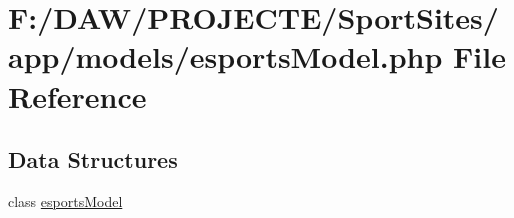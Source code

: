 \hypertarget{esports_model_8php}{}\section{F\+:/\+D\+A\+W/\+P\+R\+O\+J\+E\+C\+T\+E/\+Sport\+Sites/app/models/esports\+Model.php File Reference}
\label{esports_model_8php}
\subsection*{Data Structures}
\begin{DoxyCompactItemize}
\item 
class \hyperlink{classesports_model}{esports\+Model}
\end{DoxyCompactItemize}
